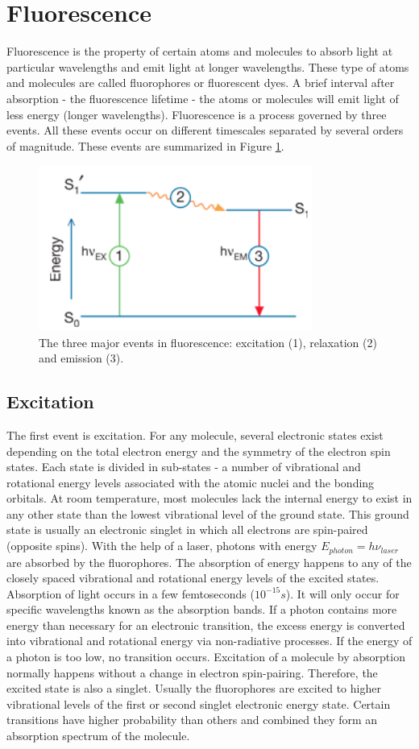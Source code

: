 \documentclass[twoside,single]{lion-msc}
\begin{document}
\section{Fluorescence}
Fluorescence is the property of certain atoms and molecules to absorb light at particular wavelengths and emit light at longer wavelengths. These type of atoms and molecules are called fluorophores or fluorescent dyes. A brief interval after absorption - the fluorescence lifetime - the atoms or molecules will emit light of less energy (longer wavelengths).  Fluorescence is a process governed by three events. All these events occur on different timescales separated by several orders of magnitude. These events are summarized in Figure \ref{fluor}.
\begin{figure}[ht!]
\centering
\includegraphics[width=90mm]{fluorescence.jpg}
\caption{The three major events in fluorescence: excitation (1), relaxation (2) and emission (3).} 
\label{fluor}
\end{figure}

\subsection{Excitation}
The first event is excitation. For any molecule, several electronic states exist depending on the total electron energy and the symmetry of the electron spin states. Each state is divided in sub-states - a number of vibrational and rotational energy levels associated with the atomic nuclei and the bonding orbitals. At room temperature, most molecules lack the internal energy to exist in any other state than the lowest vibrational level of the ground state. This ground state is usually an electronic singlet in which all electrons are spin-paired (opposite spins). With the help of a laser, photons with energy $E_{photon}=h \nu_{laser}$ are absorbed by the fluorophores. The absorption of energy happens to any of the closely spaced vibrational and rotational energy levels of the excited states. Absorption of light occurs in a few femtoseconds ($10^{-15}s$). It will only occur for specific wavelengths known as the absorption bands. If a photon contains more energy than necessary for an electronic transition, the excess energy is converted into vibrational and rotational energy via non-radiative processes. If the energy of a photon is too low, no transition occurs. Excitation of a molecule by absorption normally happens without a change in electron spin-pairing. Therefore, the excited state is also a singlet. Usually the fluorophores are excited to higher vibrational levels of the first or second singlet electronic energy state. Certain transitions have higher probability than others and combined they form an absorption spectrum of the molecule.
\end{document}
